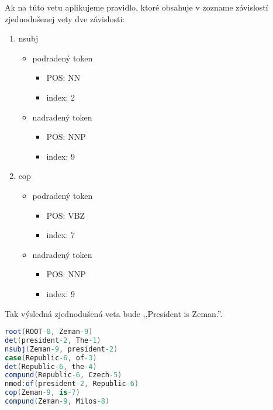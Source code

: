 Ak na túto vetu aplikujeme pravidlo, ktoré obsahuje v zozname závislostí zjednodušenej vety dve závislosti:
\begin{enumerate}
	\item nsubj
	\begin{itemize}
		\item podradený token
		\begin{itemize}
			\item POS: NN
			\item index: 2
		\end{itemize}
		\item nadradený token
		\begin{itemize}
			\item POS: NNP
			\item index: 9
		\end{itemize}
	\end{itemize}
	
	\item cop
	\begin{itemize}
		\item podradený token
		\begin{itemize}
			\item POS: VBZ
			\item index: 7
		\end{itemize}
		\item nadradený token
		\begin{itemize}
			\item POS: NNP
			\item index: 9
		\end{itemize}
	\end{itemize}
\end{enumerate}

Tak výsledná zjednodušená veta bude ,,President is Zeman.''. \\

\begin{lstlisting}[language = csharp, caption={Závislosti jednoduchej vety}, label = {code:sentence_dependencies}]
root(ROOT-0, Zeman-9)
det(president-2, The-1)
nsubj(Zeman-9, president-2)
case(Republic-6, of-3)
det(Republic-6, the-4)
compund(Republic-6, Czech-5)
nmod:of(president-2, Republic-6)
cop(Zeman-9, is-7)
compund(Zeman-9, Milos-8)
\end{lstlisting}